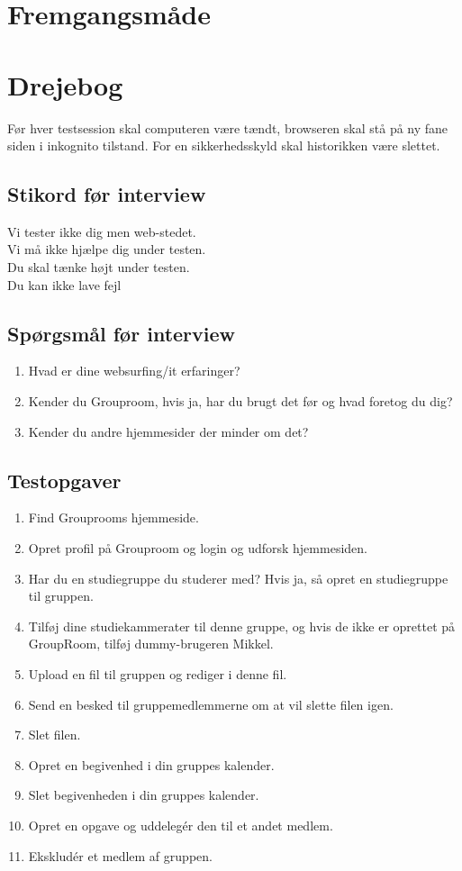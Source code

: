 \documentclass[12pt]{article}
\begin{document}
\section{Fremgangsmåde}

\section{Drejebog}
Før hver testsession skal computeren være tændt, browseren skal stå på ny fane siden i inkognito tilstand. For en sikkerhedsskyld skal historikken være slettet.
\subsection{Stikord før interview}
Vi tester ikke dig men web-stedet. \\
Vi må ikke hjælpe dig under testen. \\
Du skal tænke højt under testen. \\
Du kan ikke lave fejl
\subsection{Spørgsmål før interview}
\begin{enumerate}
  \item Hvad er dine websurfing/it erfaringer?
  \item Kender du Grouproom, hvis ja, har du brugt det før og hvad foretog du dig?
  \item Kender du andre hjemmesider der minder om det?
\end{enumerate}
\subsection{Testopgaver}
\begin{enumerate}
\item Find Grouprooms hjemmeside.
\item Opret profil på Grouproom og login og udforsk hjemmesiden.
\item Har du en studiegruppe du studerer med? Hvis ja, så opret en studiegruppe til gruppen.
\item Tilføj dine studiekammerater til denne gruppe, og hvis de ikke er oprettet på GroupRoom, tilføj dummy-brugeren Mikkel.
\item Upload en fil til gruppen og rediger i denne fil.
\item Send en besked til gruppemedlemmerne om at vil slette filen igen.
\item Slet filen.
\item Opret en begivenhed i din gruppes kalender.
\item Slet begivenheden i din gruppes kalender.
\item Opret en opgave og uddelegér den til et andet medlem.
\item Ekskludér et medlem af gruppen.
\end{enumerate}
\end{document}
